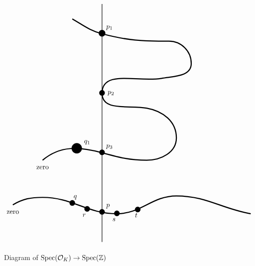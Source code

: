 \begin{figure}
\centering
$$
\begin{tikzpicture}[scale = 1.5]

\draw[thick] (0, 0) to (0, 8);

\node at (-3, 1) {zero};

\node at (0, 1) {\huge $\bullet$};
\node at (.2, 1.2) {$p$};

\node at (-1, 1.3) {\huge $\bullet$};
\node at (-.9, 1.5) {$q$};

\node at (-2, 2.5) {zero};

\draw [fill] (-.85, 3.15) circle [radius = .17];
\node at (-.5, 3.35) {$q_1$};

\node at (-.5, 1.1) {\huge $\bullet$};
\node at (-.6, .9) {$r$};

\node at (.5, .95) {\huge $\bullet$};
\node at (.4, .75) {$s$};

\node at (1.2, 1.08) {\huge $\bullet$};
\node at (1.15, .9) {$t$};

\node at (0, 3) {\huge $\bullet$};
\node at (.25, 3.2) {$p_3$};

\node at (0, 5) {\huge $\bullet$};
\node at (.3, 5) {$p_2$};

\node at (0, 7) {\Huge $\bullet$};
\node at (.25, 7.2) {$p_1$};

\draw[ultra thick] (-3, 1.25) to [out = 30, in = 180] (-2, 1.5) to [out = 0, in = 180] (.5, .95) to [out = 0, in = 180] (2.5, 1.55) to [out = 0, in = 170] (5, .95);

\draw[ultra thick] (-2, 2.75) to [out = 40, in = 165] (0, 3) to [out = -15, in = 180] (1.5, 2.75) to [out = 0, in = -90] (2.5, 3.5) to [out = 90, in = -10] (1.5, 4.5) to [out = 170, in = -90] (0, 5) to [out = 90, in = 190] (2, 5.5) to [out = 10, in = -90] (3, 6) to [out = 90, in = 0] (2.25, 6.75) to [out = 180, in = -15] (0, 7) to [out = 165, in = -30] (-1, 7.5);

\end{tikzpicture}
$$
\caption{Diagram of $\Spec(\O_K) \ra \Spec(\Z)$}
\label{fig:O_KoverSpecZ}
\end{figure}



